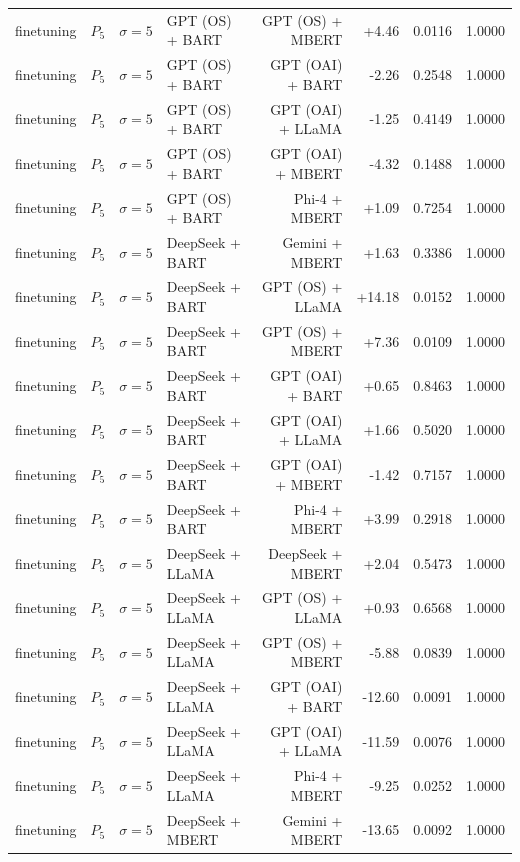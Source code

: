 \begin{table}[htbp]
\begin{tabular*}{\textwidth}{@{\extracolsep{\fill}}llllrrrl}
finetuning & $P_5$ & $\sigma{=}5$ & GPT (OS) + BART & GPT (OS) + MBERT & +4.46 & 0.0116 & 1.0000 \\
finetuning & $P_5$ & $\sigma{=}5$ & GPT (OS) + BART & GPT (OAI) + BART & -2.26 & 0.2548 & 1.0000 \\
finetuning & $P_5$ & $\sigma{=}5$ & GPT (OS) + BART & GPT (OAI) + LLaMA & -1.25 & 0.4149 & 1.0000 \\
finetuning & $P_5$ & $\sigma{=}5$ & GPT (OS) + BART & GPT (OAI) + MBERT & -4.32 & 0.1488 & 1.0000 \\
finetuning & $P_5$ & $\sigma{=}5$ & GPT (OS) + BART & Phi-4 + MBERT & +1.09 & 0.7254 & 1.0000 \\
finetuning & $P_5$ & $\sigma{=}5$ & DeepSeek + BART & Gemini + MBERT & +1.63 & 0.3386 & 1.0000 \\
finetuning & $P_5$ & $\sigma{=}5$ & DeepSeek + BART & GPT (OS) + LLaMA & +14.18 & 0.0152 & 1.0000 \\
finetuning & $P_5$ & $\sigma{=}5$ & DeepSeek + BART & GPT (OS) + MBERT & +7.36 & 0.0109 & 1.0000 \\
finetuning & $P_5$ & $\sigma{=}5$ & DeepSeek + BART & GPT (OAI) + BART & +0.65 & 0.8463 & 1.0000 \\
finetuning & $P_5$ & $\sigma{=}5$ & DeepSeek + BART & GPT (OAI) + LLaMA & +1.66 & 0.5020 & 1.0000 \\
finetuning & $P_5$ & $\sigma{=}5$ & DeepSeek + BART & GPT (OAI) + MBERT & -1.42 & 0.7157 & 1.0000 \\
finetuning & $P_5$ & $\sigma{=}5$ & DeepSeek + BART & Phi-4 + MBERT & +3.99 & 0.2918 & 1.0000 \\
finetuning & $P_5$ & $\sigma{=}5$ & DeepSeek + LLaMA & DeepSeek + MBERT & +2.04 & 0.5473 & 1.0000 \\
finetuning & $P_5$ & $\sigma{=}5$ & DeepSeek + LLaMA & GPT (OS) + LLaMA & +0.93 & 0.6568 & 1.0000 \\
finetuning & $P_5$ & $\sigma{=}5$ & DeepSeek + LLaMA & GPT (OS) + MBERT & -5.88 & 0.0839 & 1.0000 \\
finetuning & $P_5$ & $\sigma{=}5$ & DeepSeek + LLaMA & GPT (OAI) + BART & -12.60 & 0.0091 & 1.0000 \\
finetuning & $P_5$ & $\sigma{=}5$ & DeepSeek + LLaMA & GPT (OAI) + LLaMA & -11.59 & 0.0076 & 1.0000 \\
finetuning & $P_5$ & $\sigma{=}5$ & DeepSeek + LLaMA & Phi-4 + MBERT & -9.25 & 0.0252 & 1.0000 \\
finetuning & $P_5$ & $\sigma{=}5$ & DeepSeek + MBERT & Gemini + MBERT & -13.65 & 0.0092 & 1.0000 \\

\end{tabular*}
\end{table}
